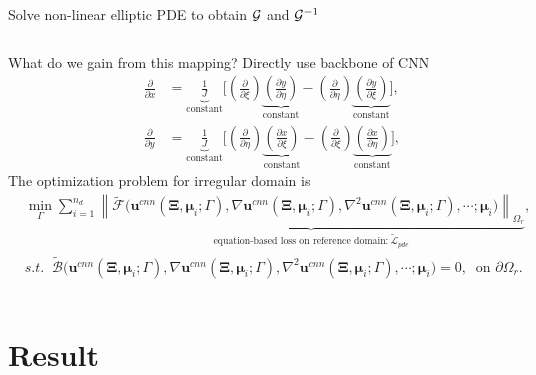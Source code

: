 \documentclass{beamer}
\begin{document}
\begin{frame}{Solve non-linear elliptic PDE to obtain $\mathcal{G}$ and $\mathcal{G}^{-1}$}
\begin{columns}[c]
\pause
What do we gain from this mapping? \pause Directly use backbone of CNN
\tiny
\begin{equation*}
	\begin{split}
		\label{eqn:Du}
		\frac{\partial }{\partial x}&=\underbrace{\frac{1}{J}}_{\text{constant}}\Big[\left(\frac{\partial }{\partial \xi}\right) \underbrace{\left(\frac{\partial y}{\partial \eta}\right)}_{\text{constant}} - \left(\frac{\partial }{\partial \eta}\right) \underbrace{\left(\frac{\partial y}{\partial \xi}\right)}_{\text{constant}}\Big],\\
		\frac{\partial }{\partial y}&=\underbrace{\frac{1}{J}}_{\text{constant}}\Big[\left(\frac{\partial }{\partial \eta}\right) \underbrace{\left(\frac{\partial x}{\partial\xi}\right)}_{\text{constant}} - \left(\frac{\partial }{\partial \xi}\right) \underbrace{\left(\frac{\partial x}{\partial \eta}\right)}_{\text{constant}}\Big],
	\end{split}
\end{equation*}
\normalsize
\pause
The optimization problem for irregular domain is
\tiny
\begin{equation*}
\label{eqn:optmizationNew}
\begin{split}
&\min_{\Gamma} \sum_{i=1}^{n_d}
\underbrace{\left\|
	\tilde{\mathcal{F}}\Big(\mathbf{u}^{cnn}(\boldsymbol{\Xi}, \boldsymbol{\mu}_i; \Gamma),
	\nabla\mathbf{u}^{cnn}(\boldsymbol{\Xi}, \boldsymbol{\mu}_i; \Gamma), 
	\nabla^2\mathbf{u}^{cnn}(\boldsymbol{\Xi}, \boldsymbol{\mu}_i; \Gamma), \cdots; \boldsymbol{\mu}_i\Big) \right\|_{\Omega_{r}}}_{\text{equation-based loss on reference domain:}\ \tilde{\mathcal{L}}_{pde}},\\
&s.t.\;\; \tilde{\mathcal{B}}\Big(\mathbf{u}^{cnn}(\boldsymbol{\Xi}, \boldsymbol{\mu}_i; \Gamma),
\nabla\mathbf{u}^{cnn}(\boldsymbol{\Xi}, \boldsymbol{\mu}_i; \Gamma), 
\nabla^2\mathbf{u}^{cnn}(\boldsymbol{\Xi}, \boldsymbol{\mu}_i; \Gamma), \cdots;
\boldsymbol{\mu}_i\Big)=0,\;\;\text{on }\partial\Omega_{r}.
\end{split}
\end{equation*} 
\end{columns}
\end{frame}


\section{Result}
\end{document}
